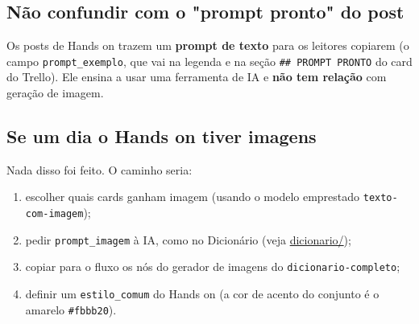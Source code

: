 \subsection*{Não confundir com o "prompt pronto" do post}

Os posts de Hands on trazem um \textbf{prompt de texto} para os leitores copiarem (o campo \nolinkurl{prompt_exemplo}, que vai na legenda e na seção \texttt{\#\# PROMPT PRONTO} do card do Trello). Ele ensina a usar uma ferramenta de IA e \textbf{não tem relação} com geração de imagem.

\subsection*{Se um dia o Hands on tiver imagens}

Nada disso foi feito. O caminho seria:

\begin{enumerate}
\item 
escolher quais cards ganham imagem (usando o modelo emprestado \nolinkurl{texto-com-imagem});


\item 
pedir \nolinkurl{prompt_imagem} à IA, como no Dicionário (veja \hyperref[sec:dicionario]{dicionario/});


\item 
copiar para o fluxo os nós do gerador de imagens do \nolinkurl{dicionario-completo};


\item 
definir um \nolinkurl{estilo_comum} do Hands on (a cor de acento do conjunto é o amarelo \texttt{\#fbbb20}).


\end{enumerate}
